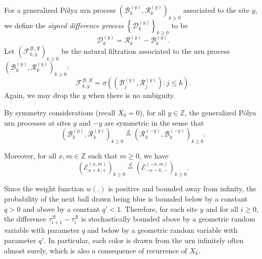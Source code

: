 \documentclass[EJP]{ejpecp} %
\begin{document}
For a generalized P\'{o}lya urn process $\left(\mathscr{B}^{(y)}_k,\mathscr{R}^{(y)}_k \right)_{k\geq 0}$ associated to the site $y$, we define the \textit{signed difference process} $\left\{\mathscr{D}^{(y)}_{k}\right\}_{k \ge 0} $ to be
\begin{equation}\label{eq:signed difference}
	\mathscr{D}^{(y)}_k  =\mathscr{R}^{(y)}_k -\mathscr{B}^{(y)}_k.  
\end{equation}
Let $\left(\mathcal{F}^{\mathscr{B},\mathscr{R}}_{k, y}\right)_{k \ge 0}$ be the natural filtration associated to the urn process $\left(\mathscr{B}^{(y)}_k,\mathscr{R}^{(y)}_k \right)_{k\geq 0}$:  
\[
\mathcal{F}^{\mathscr{B},\mathscr{R}}_{k, y} = \sigma\left( \left(\mathscr{B}_j^{(y)},\mathscr{R}_j^{(y)} \right): j\leq k \right).
\]  
Again, we may drop the $y$ when there is no ambiguity.
\begin{remark}
	\label{rm:symmetry}
	By symmetry considerations (recall $X_0 = 0$), for all $y \in \mathbb{Z}$, the generalized P\'{o}lya urn processes at sites $y$ and $-y$ are symmetric in the sense that
	\[\left(\mathscr{B}^{(y)}_{k},\mathscr{R}^{(y)}_{k} \right)_{k\ge 0}
	\overset{d}{=} 
	\left(\mathscr{R}^{(-y)}_{k},\mathscr{B}^{(-y)}_{k} \right)_{k\ge 0} 
	.\]

	Moreover, for all $x, m \in \mathbb{Z}$ such that $m\geq 0$, we have
	\[
	\left(\mathcal{E}^{(x,m)}_{x+k,+} \right)_{k\geq 0} \overset{d}{=} \left(\mathcal{E}^{(-x,m)}_{-x-k,-} \right)_{k\geq 0}.
	\]
\end{remark}
\begin{remark}
	\label{rk:UrnGeo}
	Since the weight function $w(.)$ is positive and bounded away from infinity, the probability of the next ball drawn being blue is bounded below by a constant $q > 0$ and above by a constant $q' < 1$. Therefore, for each site $y$ and for all $i \ge 0$, the difference $\tau_{i+1}^{\mathscr{B}} - \tau_{i}^{\mathscr{B}}$ is stochastically bounded above by a geometric random variable with parameter $q$ and below by a geometric random variable with parameter $q'$.
	In particular, each color is drawn from the urn infinitely often almost surely, which is also a consequence of recurrence of $X_k$.
\end{remark}
\end{document}
